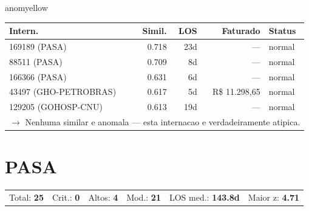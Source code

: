 \documentclass[a4paper,10pt]{article}
\begin{document}
\begin{anomalycard}[Internacao 216506 | GOHOSP-CNU | MODERADO (z=2.02)]{anomyellow}
\begin{tabular}{l r r r l}\toprule\textbf{Intern.} & \textbf{Simil.} & \textbf{LOS} & \textbf{Faturado} & \textbf{Status} \\\midrule
169189 (PASA) & 0.718 & 23d & --- & \textcolor{jcubeblue}{normal} \\
88511 (PASA) & 0.709 & 8d & --- & \textcolor{jcubeblue}{normal} \\
166366 (PASA) & 0.631 & 6d & --- & \textcolor{jcubeblue}{normal} \\
43497 (GHO-PETROBRAS) & 0.617 & 5d & R\$ 11.298,65 & \textcolor{jcubeblue}{normal} \\
129205 (GOHOSP-CNU) & 0.613 & 19d & --- & \textcolor{jcubeblue}{normal} \\
\multicolumn{5}{l}{\textcolor{jcubeblue}{\small $\rightarrow$ Nenhuma similar e anomala --- esta internacao e verdadeiramente atipica.}} \\
\bottomrule\end{tabular}


\end{anomalycard}

\newpage

\clearpage
\section{PASA}
\begin{tcolorbox}[colback=lightblue,colframe=jcubeblue,title={\textbf{Resumo --- PASA}}]
\begin{tabular}{ll@{\quad}ll@{\quad}ll}
Total: \textbf{25} &
Crit.: \textcolor{anomred}{\textbf{0}} &
Altos: \textcolor{anomorange}{\textbf{4}} &
Mod.: \textcolor{anomyellow}{\textbf{21}} &
LOS med.: \textbf{143.8d} &
Maior z: \textbf{4.71} \\


\end{tabular}
\end{tcolorbox}
\end{document}
